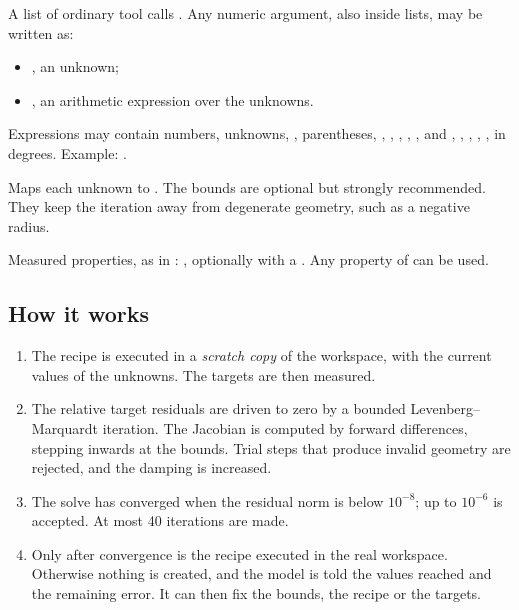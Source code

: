\begin{description}[leftmargin=1.5em, style=nextline]
  \item[recipe] A list of ordinary tool calls . Any numeric
    argument, also inside lists, may be written as:
    \begin{itemize}
      \item {}, an unknown;
      \item {}, an arithmetic expression over the unknowns.
    \end{itemize}
    Expressions may contain numbers, unknowns, \code{+ - * / **}, parentheses, ,
    , , , , and , , ,
    , ,  in degrees. Example: .
  \item[unknowns] Maps each unknown to . The bounds
    are optional but strongly recommended. They keep the iteration away from degenerate
    geometry, such as a negative radius.
  \item[targets] Measured properties, as in : ,
    optionally with a . Any property of  can be used.
\end{description}

\subsection{How it works}

\begin{enumerate}
  \item The recipe is executed in a \emph{scratch copy} of the workspace, with the current
    values of the unknowns. The targets are then measured.
  \item The relative target residuals are driven to zero by a bounded Levenberg--Marquardt
    iteration. The Jacobian is computed by forward differences, stepping inwards at the bounds.
    Trial steps that produce invalid geometry are rejected, and the damping is increased.
  \item The solve has converged when the residual norm is below $10^{-8}$; up to $10^{-6}$ is
    accepted. At most 40 iterations are made.
  \item Only after convergence is the recipe executed in the real workspace. Otherwise nothing
    is created, and the model is told the values reached and the remaining error. It can then
    fix the bounds, the recipe or the targets.
\end{enumerate}

